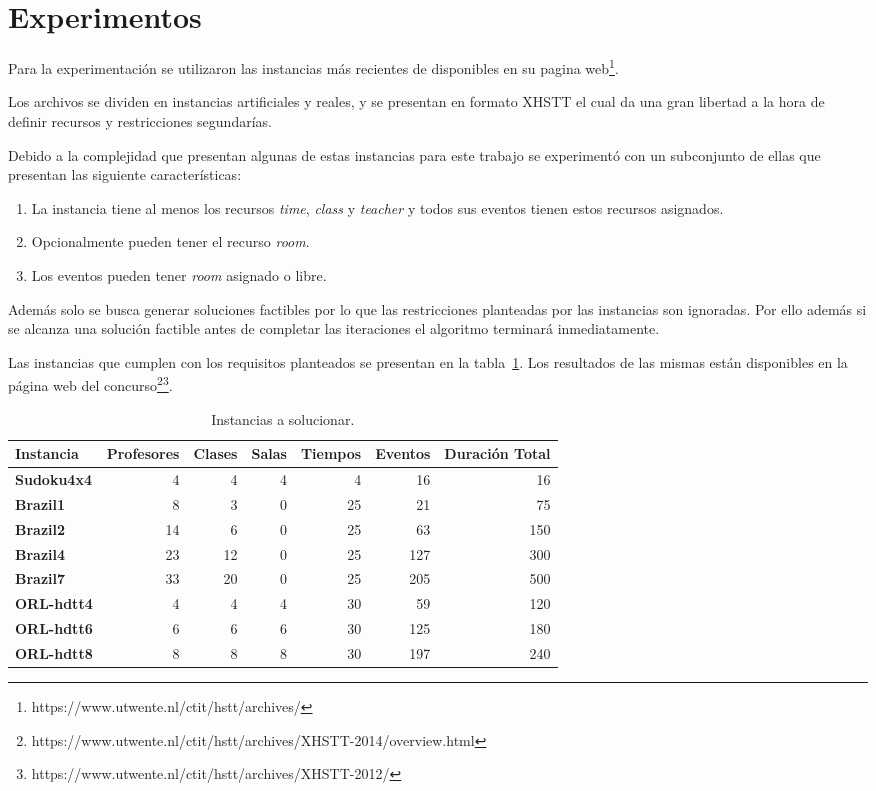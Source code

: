\documentclass[letter, 10pt]{article}
\renewcommand{\bf}[1]{\textbf{#1}}
\begin{document}
\section{Experimentos}\label{sec:exp}
Para la experimentación se utilizaron las instancias más recientes de 
\cite{post2016third} disponibles en su pagina 
web\footnote{https://www.utwente.nl/ctit/hstt/archives/}.

Los archivos se dividen en instancias artificiales y reales, y se presentan en
formato XHSTT\cite{post2014xhstt} el cual da una gran libertad a la hora de
definir recursos y restricciones segundarías.

Debido a la complejidad que presentan algunas de estas instancias para este
trabajo se experimentó con un subconjunto de ellas que presentan las siguiente
características:
\begin{enumerate}
  \item
    La instancia tiene al menos los recursos \emph{time}, \emph{class} y
    \emph{teacher} y todos sus eventos tienen estos recursos asignados.
  \item
    Opcionalmente pueden tener el recurso \emph{room}.
  \item
    Los eventos pueden tener \emph{room} asignado o libre.
\end{enumerate}

Además solo se busca generar soluciones factibles por lo que las restricciones
planteadas por las instancias son ignoradas. Por ello además si se alcanza una
solución factible antes de completar las iteraciones el algoritmo terminará
inmediatamente.

Las instancias que cumplen con los requisitos planteados se presentan en la
tabla~\ref{tab:inst}. Los resultados de las mismas están disponibles en la
página web del
concurso\footnote{https://www.utwente.nl/ctit/hstt/archives/XHSTT-2014/overview.html}\footnote{https://www.utwente.nl/ctit/hstt/archives/XHSTT-2012/}.

\begin{table}[h]
\centering
\begin{tabular}{|l|r|r|r|r|r|r|}
  \hline
  \bf{Instancia} & \bf{Profesores} & \bf{Clases} & \bf{Salas} & \bf{Tiempos} &
  \bf{Eventos} & \bf{Duración Total}  \\\hline
  \bf{Sudoku4x4} &  4  &  4  &  4  &  4  &  16  &   16  \\\hline
  \bf{Brazil1}   &  8  &  3  &  0  & 25  &  21  &   75  \\\hline
  \bf{Brazil2}   & 14  &  6  &  0  & 25  &  63  &  150  \\\hline
  \bf{Brazil4}   & 23  & 12  &  0  & 25  & 127  &  300  \\\hline
  \bf{Brazil7}   & 33  & 20  &  0  & 25  & 205  &  500  \\\hline
  \bf{ORL-hdtt4} &  4  &  4  &  4  & 30  &  59  &  120  \\\hline
  \bf{ORL-hdtt6} &  6  &  6  &  6  & 30  & 125  &  180  \\\hline
  \bf{ORL-hdtt8} &  8  &  8  &  8  & 30  & 197  &  240  \\\hline
\end{tabular}
\caption{Instancias a solucionar.}\label{tab:inst}
\end{table}
\end{document}
